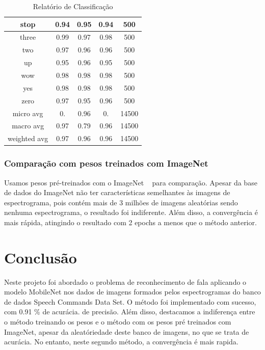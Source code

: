 \documentclass{bmvc2k}
\begin{document}
\begin{table}[ht]
\begin{tabular}{|c|c|c|c|c|}
        stop &      0.94  &    0.95  &    0.94 &      500 \\ \hline
       three &      0.99  &    0.97  &    0.98 &      500 \\ \hline
         two &      0.97  &    0.96  &    0.96 &      500 \\ \hline
          up &      0.95  &    0.96  &    0.95 &      500 \\ \hline
         wow &      0.98  &    0.98  &    0.98 &      500 \\ \hline
         yes &      0.98  &    0.98  &    0.98 &      500 \\ \hline
        zero &      0.97  &    0.95  &    0.96 &      500 \\ \hline

   micro avg &      0.   &   0.96  &    0. &    14500 \\ 
   macro avg &      0.97   &   0.79  &    0.96 &    14500 \\ 
weighted avg &      0.97   &   0.96  &    0.96 &    14500 \\ \hline
\end{tabular}
\caption{Relatório de Classificação}
\end{table}


\subsubsection*{Comparação com pesos treinados com ImageNet}

Usamos pesos pré-treinados com o ImageNet ~\cite{imagenet} para comparação. Apesar da base de dados do ImageNet não ter características semelhantes às imagens de espectrograma, pois contém mais de 3 milhões de imagens aleatórias sendo nenhuma espectrograma, o resultado foi indiferente. Além disso, a convergência é mais rápida, atingindo o resultado com 2 epochs a menos que o método anterior.


\section{Conclusão}

Neste projeto foi abordado o problema de reconhecimento de fala aplicando o modelo MobileNet nos dados de imagens formados pelos espectrogramas do banco de dados Speech Commands Data Set. O método foi implementado com sucesso, com 0.91 \% de acurácia.
de precisão. Além disso, destacamos a indiferença entre o método treinando os pesos e o método com os pesos pré treinados com ImageNet, apesar da aleatóriedade deste banco de imagens, no que se trata de acurácia. No entanto, neste segundo método, a convergência é mais rapida.

\newpage

\end{document}
